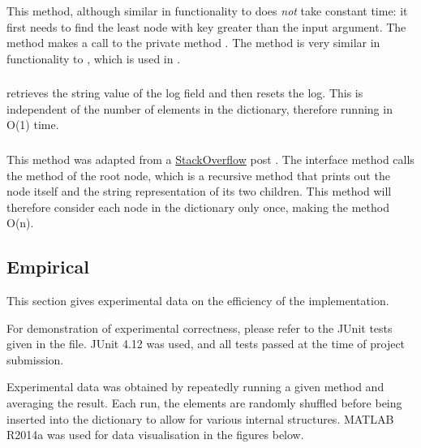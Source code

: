 \subsubsection{}
This method, although similar in functionality to  does \textit{not} take constant time: it first needs to find the least node with key greater than the input argument. The method makes a call to the private method . The method  is very similar in functionality to , which is used in .

\subsubsection{}
 retrieves the string value of the  log field and then resets the log. This is independent of the number of elements in the dictionary, therefore running in O(1) time.

\subsubsection{}
This method was adapted from a \href{http://stackoverflow.com/}{StackOverflow} post \parencite{stackoverflow}. The interface method  calls the  method of the root node, which is a recursive method that prints out the node itself and the string representation of its two children. This method will therefore consider each node in the dictionary only once, making the method O(n).

\subsection{Empirical}

This section gives experimental data on the efficiency of the implementation.

For demonstration of experimental correctness, please refer to the JUnit tests given in the  file. JUnit 4.12 was used, and all tests passed at the time of project submission.

Experimental data was obtained by repeatedly running a given method and averaging the result. Each run, the elements are randomly shuffled before being inserted into the dictionary to allow for various internal structures. MATLAB R2014a was used for data visualisation in the figures below.

